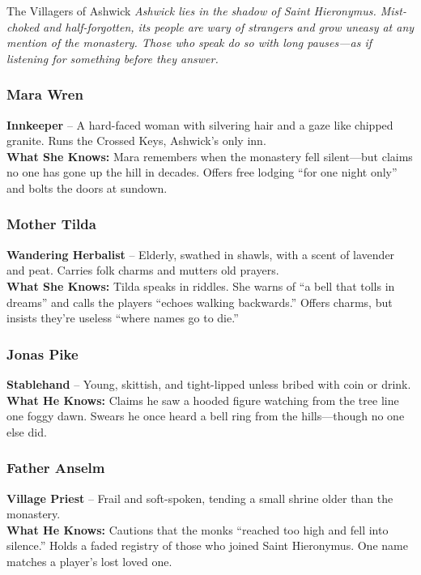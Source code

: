 \vspace*{\fill}
\begin{NPC}[%
    description=The last voices before the silence,%
]{The Villagers of Ashwick}
    \emph{Ashwick lies in the shadow of Saint Hieronymus. Mist-choked and half-forgotten, its people are wary of strangers and grow uneasy at any mention of the monastery. Those who speak do so with long pauses—as if listening for something before they answer.}

    \vspace{0.5\baselineskip}
    \subsubsection*{Mara Wren}
    \textbf{Innkeeper} – A hard-faced woman with silvering hair and a gaze like chipped granite. Runs the Crossed Keys, Ashwick’s only inn.\\
    \noindent\textbf{What She Knows:} Mara remembers when the monastery fell silent—but claims no one has gone up the hill in decades. Offers free lodging “for one night only” and bolts the doors at sundown.

    \vspace{0.5\baselineskip}
    \subsubsection*{Mother Tilda}
    \textbf{Wandering Herbalist} – Elderly, swathed in shawls, with a scent of lavender and peat. Carries folk charms and mutters old prayers.\\
    \noindent\textbf{What She Knows:} Tilda speaks in riddles. She warns of “a bell that tolls in dreams” and calls the players “echoes walking backwards.” Offers charms, but insists they’re useless “where names go to die.”

    \vspace{0.5\baselineskip}
    \subsubsection*{Jonas Pike}
    \textbf{Stablehand} – Young, skittish, and tight-lipped unless bribed with coin or drink.\\
    \noindent\textbf{What He Knows:} Claims he saw a hooded figure watching from the tree line one foggy dawn. Swears he once heard a bell ring from the hills—though no one else did.

    \vspace{0.5\baselineskip}
    \subsubsection*{Father Anselm}
    \textbf{Village Priest} – Frail and soft-spoken, tending a small shrine older than the monastery.\\
    \noindent\textbf{What He Knows:} Cautions that the monks “reached too high and fell into silence.” Holds a faded registry of those who joined Saint Hieronymus. One name matches a player’s lost loved one.
\end{NPC}

